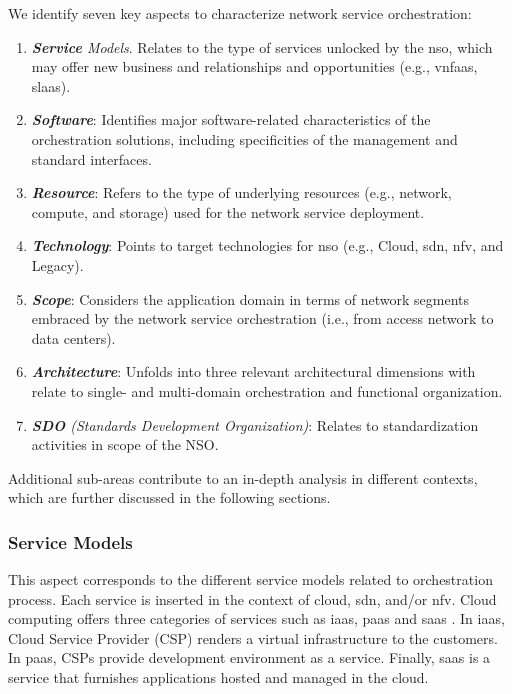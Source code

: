 We identify seven key aspects to characterize network service orchestration: 
\begin{enumerate}
\item \textit{\textbf{Service} Models}. Relates to the type of services unlocked by the \gls{nso}, which may offer new business and relationships and opportunities  (e.g., \gls{vnfaas}, \gls{slaas}).
\item \textbf{\textit{Software}}: Identifies major software-related characteristics of the orchestration solutions, including specificities of the  management and standard interfaces.
\item \textbf{\textit{Resource}}: Refers to the type of underlying resources (e.g., network, compute, and storage) used for the network service deployment.
\item \textbf{\textit{Technology}}: Points to target technologies for \gls{nso} (e.g., Cloud, \gls{sdn}, \gls{nfv}, and Legacy).
\item \textit{\textbf{Scope}}: Considers the application domain in terms of network segments embraced by the network service orchestration (i.e., from access network to data centers).  
\item \textbf{\textit{Architecture}}: Unfolds into three relevant architectural dimensions with relate to single- and multi-domain orchestration and functional  organization.
\item \textit{\textbf{SDO} (Standards Development Organization)}: Relates to standardization activities in scope of the NSO.
\end{enumerate}

Additional sub-areas contribute to an in-depth analysis in different contexts, which are  further  discussed in the following sections. 

\subsubsection{Service Models}
This aspect corresponds to the different service models related to orchestration process. Each service is inserted in the context of cloud, \gls{sdn}, and/or \gls{nfv}. Cloud computing offers three categories of services such as \gls{iaas}, \gls{paas} and \gls{saas} \cite{Leavitt2009}. In \gls{iaas}, Cloud Service Provider (CSP) renders a virtual infrastructure to the customers. In \gls{paas}, CSPs provide development environment as a service. Finally, \gls{saas} is a service that furnishes applications hosted and managed in the cloud. 

